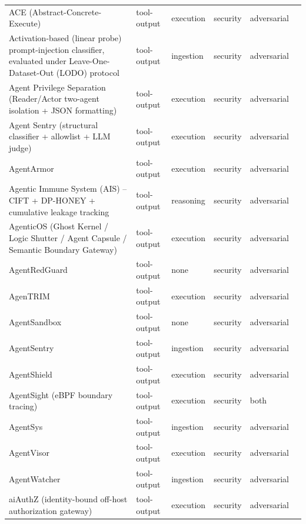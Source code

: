\begin{longtable}{@{}>{\raggedright\arraybackslash}p{}lllll@{}}
ACE (Abstract-Concrete-Execute) & tool-output & execution & security & adversarial & \cite{li-2025-ace} \\
Activation-based (linear probe) prompt-injection classifier, evaluated under Leave-One-Dataset-Out (LODO) protocol & tool-output & ingestion & security & adversarial & \cite{fomin-2026-benchmarks} \\
Agent Privilege Separation (Reader/Actor two-agent isolation + JSON formatting) & tool-output & execution & security & adversarial & \cite{cheng-2026-agent} \\
Agent Sentry (structural classifier + allowlist + LLM judge) & tool-output & execution & security & adversarial & \cite{sequeira-2026-agentsentry} \\
AgentArmor & tool-output & execution & security & adversarial & \cite{wang-2025-agentarmor} \\
Agentic Immune System (AIS) -- CIFT + DP-HONEY + cumulative leakage tracking & tool-output & reasoning & security & adversarial & \cite{chauhan-2026-caught} \\
AgenticOS (Ghost Kernel / Logic Shutter / Agent Capsule / Semantic Boundary Gateway) & tool-output & execution & security & adversarial & \cite{zhao-2026-agenticos} \\
AgentRedGuard & tool-output & none & security & adversarial & \cite{dingeto-2026-agentredbench} \\
AgenTRIM & tool-output & execution & security & adversarial & \cite{betser-2026-agentrim} \\
AgentSandbox & tool-output & none & security & adversarial & \cite{zhang-2025-llm} \\
AgentSentry & tool-output & ingestion & security & adversarial & \cite{zhang-2026-agentsentry} \\
AgentShield & tool-output & execution & security & adversarial & \cite{rassul-2026-agentshield} \\
AgentSight (eBPF boundary tracing) & tool-output & execution & security & both & \cite{zheng-2025-agentsight} \\
AgentSys & tool-output & ingestion & security & adversarial & \cite{wen-2026-agentsys} \\
AgentVisor & tool-output & execution & security & adversarial & \cite{ying-2026-agentvisor} \\
AgentWatcher & tool-output & ingestion & security & adversarial & \cite{wang-2026-agentwatcher} \\
aiAuthZ (identity-bound off-host authorization gateway) & tool-output & execution & security & adversarial & \cite{kodathala-2026-aiauthz} \\

\end{longtable}

